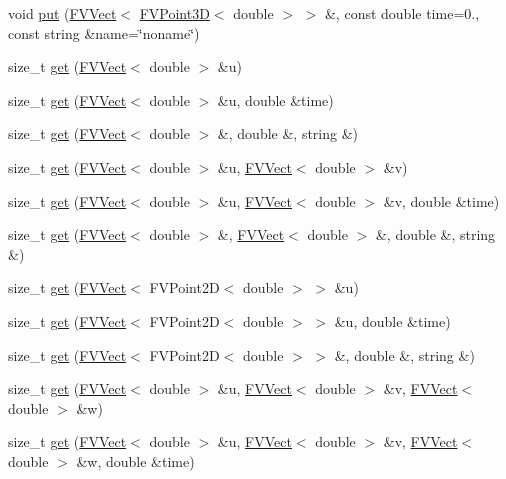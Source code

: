 \begin{DoxyCompactItemize}
\item 
void \hyperlink{classFVio_a60aad07de3ad49fe4c05e2a59ee4e64f}{put} (\hyperlink{classFVVect}{FVVect}$<$ \hyperlink{classFVPoint3D}{FVPoint3D}$<$ double $>$ $>$ \&, const double time=0., const string \&name=\char`\"{}noname\char`\"{})
\item 
size\_\-t \hyperlink{classFVio_a5191ef01cb57c47fab251c8522722e9c}{get} (\hyperlink{classFVVect}{FVVect}$<$ double $>$ \&u)
\item 
size\_\-t \hyperlink{classFVio_a1ffaebb7a226b10a5eda100d90de6c10}{get} (\hyperlink{classFVVect}{FVVect}$<$ double $>$ \&u, double \&time)
\item 
size\_\-t \hyperlink{classFVio_a5ea6770f0f9a764f9e45bd7926b94169}{get} (\hyperlink{classFVVect}{FVVect}$<$ double $>$ \&, double \&, string \&)
\item 
size\_\-t \hyperlink{classFVio_afb6c8ab6a4216b01056b53012c152acc}{get} (\hyperlink{classFVVect}{FVVect}$<$ double $>$ \&u, \hyperlink{classFVVect}{FVVect}$<$ double $>$ \&v)
\item 
size\_\-t \hyperlink{classFVio_a9002feadcd4d5ce3900a5f972284d8c8}{get} (\hyperlink{classFVVect}{FVVect}$<$ double $>$ \&u, \hyperlink{classFVVect}{FVVect}$<$ double $>$ \&v, double \&time)
\item 
size\_\-t \hyperlink{classFVio_a20150469af5dec61b33ff521916e11f7}{get} (\hyperlink{classFVVect}{FVVect}$<$ double $>$ \&, \hyperlink{classFVVect}{FVVect}$<$ double $>$ \&, double \&, string \&)
\item 
size\_\-t \hyperlink{classFVio_afb116b2ec6808a030f711d9d7af18534}{get} (\hyperlink{classFVVect}{FVVect}$<$ FVPoint2D$<$ double $>$ $>$ \&u)
\item 
size\_\-t \hyperlink{classFVio_aae1711390a6217e8bf7357c413723584}{get} (\hyperlink{classFVVect}{FVVect}$<$ FVPoint2D$<$ double $>$ $>$ \&u, double \&time)
\item 
size\_\-t \hyperlink{classFVio_af562bf51c66221c9c8899319d682e148}{get} (\hyperlink{classFVVect}{FVVect}$<$ FVPoint2D$<$ double $>$ $>$ \&, double \&, string \&)
\item 
size\_\-t \hyperlink{classFVio_a015e3aa19b1fe1a19bf5fb3c24d1e33e}{get} (\hyperlink{classFVVect}{FVVect}$<$ double $>$ \&u, \hyperlink{classFVVect}{FVVect}$<$ double $>$ \&v, \hyperlink{classFVVect}{FVVect}$<$ double $>$ \&w)
\item 
size\_\-t \hyperlink{classFVio_ae5f9d2dc9547ce8f4a7f574e0312299c}{get} (\hyperlink{classFVVect}{FVVect}$<$ double $>$ \&u, \hyperlink{classFVVect}{FVVect}$<$ double $>$ \&v, \hyperlink{classFVVect}{FVVect}$<$ double $>$ \&w, double \&time)

\end{DoxyCompactItemize}

